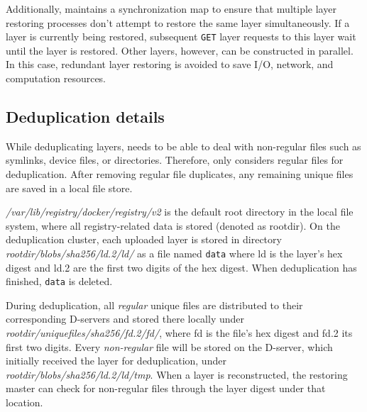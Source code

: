Additionally, \sysname maintains a synchronization map to ensure that multiple layer
restoring processes don't attempt to restore the same layer simultaneously.
%
If a layer is currently being restored, subsequent
\texttt{GET} layer requests to this layer wait until the layer is restored.
%
Other layers, however, can be constructed in parallel.
%
In this case, redundant layer restoring is avoided to save I/O, network, and
computation resources.
 
 
\subsection{Deduplication details}
\label{sec:deduplication-details}

%
While deduplicating layers, \sysname needs to be able to deal with
non-regular files such as symlinks, device files, or directories.
%
%
Therefore, \sysname only considers regular files for deduplication.
%
After removing regular file duplicates, any remaining unique files are saved in a local file store.
%

\emph{/var/lib/registry/docker/registry/v2} is the default root directory in the local file system, where all
registry-related data is stored (denoted as rootdir).
%
On the deduplication cluster,
each uploaded layer is stored in directory \emph{rootdir/blobs/sha256/ld.2/ld/}
as a file named \texttt{data} where ld is the layer's hex
digest and ld.2 are the first two digits of the hex digest.
%
When deduplication has finished, \texttt{data} is deleted.

During deduplication, all \emph{regular} unique files are distributed to their
corresponding D-servers and stored there locally under
\emph{rootdir/uniquefiles/sha256/fd.2/fd/}, where fd is the file's hex
digest and fd.2 its first two digits.
%
Every \emph{non-regular} file will be stored on the D-server, which initially
received the layer for deduplication, under \emph{rootdir/blobs/sha256/ld.2/ld/tmp}.
%
When a layer is reconstructed, the restoring master can check for non-regular files through
the layer digest under that location.
%

